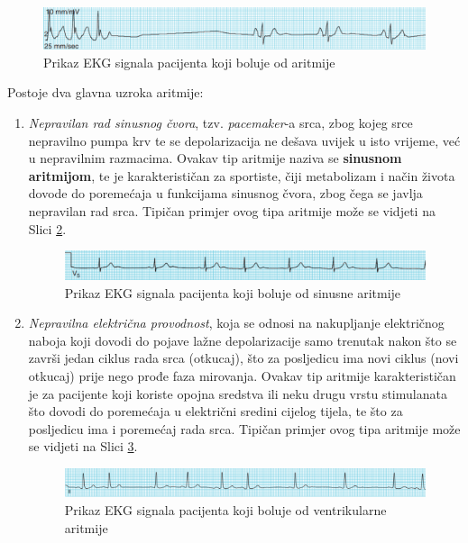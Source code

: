\documentclass[12pt,a4paper]{article}
\begin{document}
\begin{figure}[H]
\center
\includegraphics[scale=0.6]{../res/s2.PNG}
\caption{Prikaz EKG signala pacijenta koji boluje od aritmije}
\label{s2}
\end{figure}

\quad Postoje dva glavna uzroka aritmije:

\begin{enumerate}

\item \textit{Nepravilan rad sinusnog čvora}, tzv. \textit{pacemaker}-a srca, zbog kojeg srce nepravilno pumpa krv te se depolarizacija ne dešava uvijek u isto vrijeme, već u nepravilnim razmacima. Ovakav tip aritmije naziva se \textbf{sinusnom aritmijom}, te je karakterističan za sportiste, čiji metabolizam i način života dovode do poremećaja u funkcijama sinusnog čvora, zbog čega se javlja nepravilan rad srca. Tipičan primjer ovog tipa aritmije može se vidjeti na Slici \ref{s3}.

\begin{figure}[H]
\center
\includegraphics[scale=0.7]{../res/s3.PNG}
\caption{Prikaz EKG signala pacijenta koji boluje od sinusne aritmije}
\label{s3}
\end{figure}

\item \textit{Nepravilna električna provodnost}, koja se odnosi na nakupljanje električnog naboja koji dovodi do pojave lažne depolarizacije samo trenutak nakon što se završi jedan ciklus rada srca (otkucaj), što za posljedicu ima novi ciklus (novi otkucaj) prije nego prođe faza mirovanja. Ovakav tip aritmije karakterističan je za pacijente koji koriste opojna sredstva ili neku drugu vrstu stimulanata što dovodi do poremećaja u električni sredini cijelog tijela, te što za posljedicu ima i poremećaj rada srca. Tipičan primjer ovog tipa aritmije može se vidjeti na Slici \ref{s4}.

\begin{figure}[H]
\center
\includegraphics[scale=0.6]{../res/s4.PNG}
\caption{Prikaz EKG signala pacijenta koji boluje od ventrikularne aritmije}
\label{s4}
\end{figure}

\end{enumerate}
\end{document}
